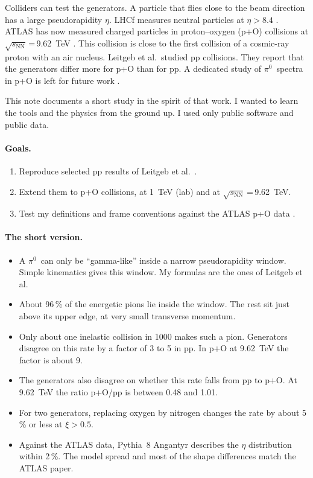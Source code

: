 \documentclass[11pt,a4paper]{article}
\newcommand{\pizero}{\ensuremath{\pi^{0}}}
\newcommand{\sNN}{\ensuremath{\sqrt{s_{\mathrm{NN}}}}}
\begin{document}
Colliders can test the generators.
A particle that flies close to the beam direction has a large pseudorapidity $\eta$.
LHCf measures neutral particles at $\eta>8.4$ \cite{LHCf:2012pi0}.
ATLAS has now measured charged particles in proton--oxygen (p+O) collisions at \sNN\,=\,9.62~TeV \cite{ATLAS:2026po}.
This collision is close to the first collision of a cosmic-ray proton with an air nucleus.
Leitgeb et al.\ studied pp collisions.
They report that the generators differ more for p+O than for pp.
A dedicated study of \pizero\ spectra in p+O is left for future work \cite{Leitgeb:2025prd}.

This note documents a short study in the spirit of that work.
I wanted to learn the tools and the physics from the ground up.
I used only public software and public data.

\paragraph{Goals.}
\begin{enumerate}
  \item[\textbf{G1}] Reproduce selected pp results of Leitgeb et al.\ \cite{Leitgeb:2025prd}.
  \item[\textbf{G2}] Extend them to p+O collisions, at 1~TeV (lab) and at \sNN\,=\,9.62~TeV.
  \item[\textbf{G3}] Test my definitions and frame conventions against the ATLAS p+O data \cite{ATLAS:2026po}.
\end{enumerate}

\paragraph{The short version.}
\begin{itemize}
  \item A \pizero\ can only be ``gamma-like'' inside a narrow pseudorapidity window. Simple kinematics gives this window. My formulas are the ones of Leitgeb et al.
  \item About 96\,\% of the energetic pions lie inside the window. The rest sit just above its upper edge, at very small transverse momentum.
  \item Only about one inelastic collision in 1000 makes such a pion. Generators disagree on this rate by a factor of 3 to 5 in pp. In p+O at 9.62~TeV the factor is about 9.
  \item The generators also disagree on whether this rate falls from pp to p+O. At 9.62~TeV the ratio p+O/pp is between 0.48 and 1.01.
  \item For two generators, replacing oxygen by nitrogen changes the rate by about 5\,\% or less at $\xi>0.5$.
  \item Against the ATLAS data, Pythia~8 Angantyr describes the $\eta$ distribution within 2\,\%. The model spread and most of the shape differences match the ATLAS paper.
\end{itemize}
\end{document}
